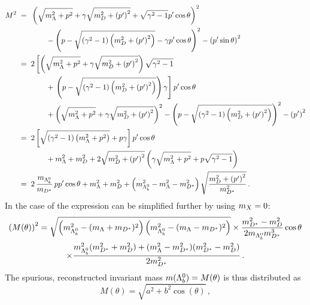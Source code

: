 \begin{align*}
    M^2\;=\;\;& \left( \sqrt{m_{{\Lambda}}^2 + p^2} + \gamma \sqrt{m_{D}^2 + \left(p' \right)^2} + \sqrt{\gamma^2 - 1} p' \cos \theta \right)^2 \\
    &\quad\quad - \left( p - \sqrt{\left( \gamma^2 - 1 \right) \left(m_{D}^2 + \left(p' \right)^2 \right)} - \gamma p' \cos \theta \right)^2 - \left(p' \sin \theta \right)^2 \\
    =\;\;& 2 \left[ \left( \sqrt{m_{{\Lambda}}^2 + p^2} + \gamma \sqrt{m_{D}^2 + \left(p' \right)^2} \right) \sqrt{\gamma^2 - 1} \right. \\
    &\quad\quad + \left. \left( p - \sqrt{\left( \gamma^2 - 1 \right) \left(m_{D}^2 + \left(p' \right)^2 \right)} \right) \gamma \right] p' \cos \theta \\
    &\quad\quad + \left( \sqrt{m_{{\Lambda}}^2 + p^2} + \gamma \sqrt{m_{D}^2 + \left(p' \right)^2} \right)^2 - \left( p - \sqrt{\left( \gamma^2 - 1 \right) \left(m_{D}^2 + \left(p' \right)^2 \right)} \right)^2 - \left(p' \right)^2 \\
    =\;\;& 2 \left[ \sqrt{\left(\gamma^2 - 1 \right) \left( m_{{\Lambda}}^2 + p^2 \right)} + p \gamma \right] p' \cos \theta \\
    &\quad\quad + m_{{\Lambda}}^2 + m_{D}^2 + 2 \sqrt{m_{D}^2 + \left(p' \right)^2} \left( \gamma \sqrt{m_{{\Lambda}}^2 + p^2} + p \sqrt{ \gamma^2 - 1} \right) \\
    =\;\;& 2 \, \frac{m_{{{\Lambda}^0_{b}}}}{m_{{{D}^*}}} \, p p' \cos \theta + m_{{\Lambda}}^2 + m_{D}^2 + \left( m_{{{\Lambda}^0_{b}}}^2 - m_{{\Lambda}}^2 - m_{{{D}^*}}^2 \right) \sqrt{\frac{m_{D}^2 + \left(p' \right)^2}{m_{{{D}^*}}^2}} \,.
\end{align*}
In the case of \decay{\Dstarz}{\Dz\Pgamma} the expression can be simplified further by using $m_{X} = 0$:
\begin{multline*}
    \left( M(\theta) \right)^2 = \sqrt{\left( m_{{{\Lambda}^0_{b}}}^2 - (m_{{\Lambda}} + m_{{{D}^*}})^2 \right) \left( m_{{{\Lambda}^0_{b}}}^2 - (m_{{\Lambda}} - m_{{{D}^*}})^2 \right)} \times \frac{m_{{{D}^*}}^2 - m_{D}^2}{2 m_{{{\Lambda}^0_{b}}} m_{{{D}^*}}^3} \cos \theta \\
    \times \frac{m_{{{\Lambda}^0_{b}}}^2 (m_{{{D}^*}}^2 + m_{D}^2) + (m_{{\Lambda}}^2 - m_{{{D}^*}}^2)(m_{{{D}^*}}^2 - m_{D}^2)}{2 m_{{{D}^*}}^2} \,.
\end{multline*}
The spurious, reconstructed invariant mass $m({{\Lambda}^0_{b}}) = M(\theta)$ is thus distributed as
\begin{equation*}
    \label{eq:apdx_partbkg_mtheta}
    M(\theta) = \sqrt{a^2 + b^2 \cos(\theta)} \,,
\end{equation*}

